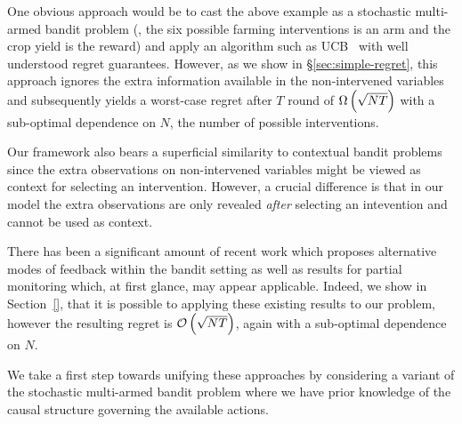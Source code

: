 One obvious approach would be to cast the above example as a stochastic multi-armed bandit problem (\eg, the six possible farming interventions is an arm and the crop yield is the reward) and apply an algorithm such as UCB~\cite{Auer1995} with well understood regret guarantees.
However, as we show in \S\ref{sec:simple-regret}, this approach ignores the extra information available in the non-intervened variables and subsequently yields a worst-case regret after $T$ round of $\Omega\left( \sqrt{NT} \right)$ with a sub-optimal dependence on $N$, the number of possible interventions.


Our framework also bears a superficial similarity to contextual bandit problems \cite{Langford2008,Agarwal2014} since the extra observations on non-intervened variables might be viewed as context for selecting an intervention. However, a crucial difference is that in our model the extra observations are only revealed \emph{after} selecting an intevention and cannot be used as context.

There has been a significant amount of recent work which proposes alternative modes of feedback within the bandit setting \cite{TODO} as well as results for partial monitoring which, at first glance, may appear applicable. Indeed, we show in Section~\ref{}, that it is possible to applying these existing results to our problem, however the resulting regret is $\mathcal{O}\left( \sqrt{NT} \right)$, again with a sub-optimal dependence on $N$.





We take a first step towards unifying these approaches by considering a variant of the stochastic multi-armed bandit problem where we have prior knowledge of the causal structure governing the available actions. 

